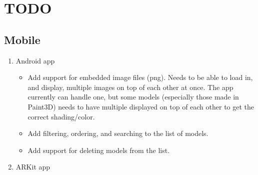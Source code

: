 
\chapter{TODO}

    \section{Mobile}
        \begin{enumerate}
            \item Android app
            \begin{itemize}
                \item Add support for embedded image files (png).  Needs to be able to load in, and display, multiple images on top of each other at once.  The app currently can handle one, but some models (especially those made in Paint3D) needs to have multiple displayed on top of each other to get the correct shading/color.

                \item Add filtering, ordering, and searching to the list of models.

                \item Add support for deleting models from the list.
            \end{itemize}
            \item ARKit app
        \end{enumerate}